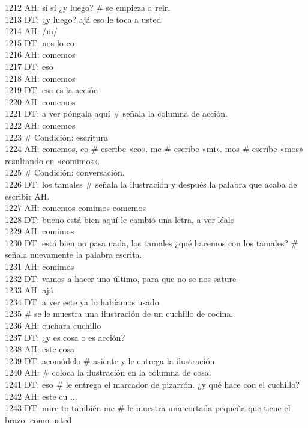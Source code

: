1212 AH: sí sí ¿y luego? # se empieza a reir.\\
1213 DT: ¿y luego? ajá eso le toca a usted\\
1214 AH: /m/\\
1215 DT: nos lo co\\
1216 AH: comemos\\
1217 DT: eso\\
1218 AH: comemos\\
1219 DT: esa es la acción\\
1220 AH: comemos\\
1221 DT: a ver póngala aquí # señala la columna de acción.\\
1222 AH: comemos\\
1223 # Condición: escritura\\
1224 AH: comemos, co # escribe «co». me # escribe «mi». mos # escribe «mos» resultando en «comimos».\\
1225 # Condición: conversación.\\
1226 DT: los tamales # señala la ilustración y después la palabra que acaba de escribir AH.\\
1227 AH: comemos comimos comemos\\
1228 DT: bueno está bien aquí le cambió una letra, a ver léalo\\
1229 AH: comimos\\
1230 DT: está bien no pasa nada, los tamales ¿qué hacemos con los tamales? # señala nuevamente la palabra escrita.\\
1231 AH: comimos\\
1232 DT: vamos a hacer uno último, para que no se nos sature\\
1233 AH: ajá\\
1234 DT: a ver este ya lo habíamos usado\\
1235 # se le muestra una ilustración de un cuchillo de cocina.\\
1236 AH: cuchara cuchillo\\
1237 DT: ¿y es cosa o es acción?\\
1238 AH: este cosa\\
1239 DT: acomódelo # asiente y le entrega la ilustración.\\
1240 AH: # coloca la ilustración en la columna de cosa.\\
1241 DT: eso # le entrega el marcador de pizarrón. ¿y qué hace con el cuchillo?\\
1242 AH: este cu ...\\
1243 DT: mire to también me # le muestra una cortada pequeña que tiene el brazo. como usted\\
